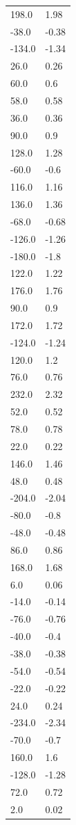 \begin{longtable}{ll}
198.0 & 1.98 \\
-38.0 & -0.38 \\
-134.0 & -1.34 \\
26.0 & 0.26 \\
60.0 & 0.6 \\
58.0 & 0.58 \\
36.0 & 0.36 \\
90.0 & 0.9 \\
128.0 & 1.28 \\
-60.0 & -0.6 \\
116.0 & 1.16 \\
136.0 & 1.36 \\
-68.0 & -0.68 \\
-126.0 & -1.26 \\
-180.0 & -1.8 \\
122.0 & 1.22 \\
176.0 & 1.76 \\
90.0 & 0.9 \\
172.0 & 1.72 \\
-124.0 & -1.24 \\
120.0 & 1.2 \\
76.0 & 0.76 \\
232.0 & 2.32 \\
52.0 & 0.52 \\
78.0 & 0.78 \\
22.0 & 0.22 \\
146.0 & 1.46 \\
48.0 & 0.48 \\
-204.0 & -2.04 \\
-80.0 & -0.8 \\
-48.0 & -0.48 \\
86.0 & 0.86 \\
168.0 & 1.68 \\
6.0 & 0.06 \\
-14.0 & -0.14 \\
-76.0 & -0.76 \\
-40.0 & -0.4 \\
-38.0 & -0.38 \\
-54.0 & -0.54 \\
-22.0 & -0.22 \\
24.0 & 0.24 \\
-234.0 & -2.34 \\
-70.0 & -0.7 \\
160.0 & 1.6 \\
-128.0 & -1.28 \\
72.0 & 0.72 \\
2.0 & 0.02 \\

\end{longtable}
